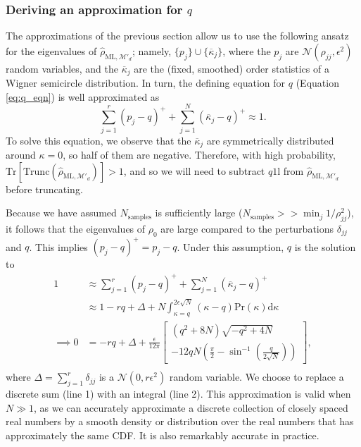 \documentclass[aps,pra, twocolumn]{revtex4-1}
\newcommand{\M}{\mathcal{M}}
\newcommand{\Tr}{\mathrm{Tr}}
\newcommand{\Id}{\mathbb{I}}
\def\Id{1\!\mathrm{l}}
\newcommand{\rhohat}{\hat{\rho}}
\newcommand{\rhoML}[1]{\rhohat_{\scriptscriptstyle{\mathrm{ML},#1}}}
\begin{document}
\subsubsection{Deriving an approximation for $q$}
The approximations of the previous section allow us to use the following ansatz for the eigenvalues of $\rhoML{\M'_{d}}$; namely, $\{p_j\} \cup \{\overline{\kappa}_j\}$, where the $p_j$ are $\mathcal{N}(\rho_{jj},\epsilon^2)$ random variables, and the $\overline{\kappa}_j$ are the (fixed, smoothed) order statistics of a Wigner semicircle distribution.  In turn, the defining equation for $q$ (Equation \eqref{eq:q_eqn}) is well approximated as
\begin{equation}
\sum_{j=1}^{r}(p_j - q)^{+} + \sum_{j=1}^{N}{(\overline{\kappa}_j-q)^+} \approx 1.
\end{equation}
To solve this equation, we observe that the $\overline{\kappa}_j$ are symmetrically distributed around $
\kappa=0$, so half of them are negative.  Therefore, with high probability, $\Tr
\left[\mathrm{Trunc}(\rhoML{\M'_{d}})\right]>1$, and so we will need to subtract $q\Id$ from $\rhoML{\M'_{d}}$ before truncating.

Because we have assumed $N_{\mathrm{samples}}$ is sufficiently large ($N_{\mathrm{samples}} >> \min_{j}1/\rho_{jj}^{2}$), it follows that the eigenvalues of $\rho_{0}$ are large compared to the perturbations $\delta_{jj}$ and $q$. This implies $(p_{j} - q)^{+} = p_{j} - q$. Under this assumption, $q$ is the solution to
\begin{align}
\nonumber 1 &\approx \sum_{j=1}^{r}(p_j - q)^{+} + \sum_{j=1}^{N}{(\overline{\kappa}_j-q)^+}\\
\nonumber &\approx 1 - rq + \Delta + N\int_{\kappa=q}^{2\epsilon\sqrt{N}}{(\kappa-q)\mathrm{Pr}(\kappa)\mathrm{d}\kappa}\\
\label{eq:q_eqn2}\implies 0 &= - rq + \Delta + \frac{\epsilon}{12\pi}\left[
\begin{array}{l} (q^2+8N)\sqrt{-q^2+4N} \\
-12qN\left(\frac{\pi}{2}-\sin^{-1}\left(\frac{q}{2\sqrt{N}}\right)\right)
\end{array}\right],\nonumber\\
~
\end{align}
where $\Delta = \sum_{j=1}^{r}\delta_{jj}$ is a $\mathcal{N}(0,r\epsilon^2)$ random variable.  We choose to replace a discrete 
sum (line 1) with an integral (line 2). This approximation is valid when $N\gg1$, as we can accurately approximate a discrete collection of closely spaced real numbers by a smooth density or distribution over the real numbers that has approximately the same CDF.  It is also remarkably accurate in practice.
  
\end{document}
